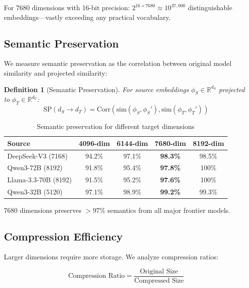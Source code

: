 \documentclass[11pt,letterpaper]{article}
\newtheorem{definition}{Definition}[section]
\begin{document}
For 7680 dimensions with 16-bit precision: $2^{16 \times 7680} \approx 10^{37,000}$ distinguishable embeddings---vastly exceeding any practical vocabulary.

\subsection{Semantic Preservation}

We measure semantic preservation as the correlation between original model similarity and projected similarity:

\begin{definition}[Semantic Preservation]
For source embeddings $\phi_S \in \mathbb{R}^{d_S}$ projected to $\phi_T \in \mathbb{R}^{d_T}$:
\begin{equation}
\text{SP}(d_S \to d_T) = \text{Corr}\left(\text{sim}(\phi_S, \phi_S'), \text{sim}(\phi_T, \phi_T')\right)
\end{equation}
\end{definition}

\begin{table}[h]
\centering
\caption{Semantic preservation for different target dimensions}
\label{tab:preservation}
\begin{tabular}{lcccc}
\toprule
\textbf{Source} & \textbf{4096-dim} & \textbf{6144-dim} & \textbf{7680-dim} & \textbf{8192-dim} \\
\midrule
DeepSeek-V3 (7168) & 94.2\% & 97.1\% & \textbf{98.3\%} & 98.5\% \\
Qwen3-72B (8192) & 91.8\% & 95.4\% & \textbf{97.8\%} & 100\% \\
Llama-3.3-70B (8192) & 91.5\% & 95.2\% & \textbf{97.6\%} & 100\% \\
Qwen3-32B (5120) & 97.1\% & 98.9\% & \textbf{99.2\%} & 99.3\% \\
\bottomrule
\end{tabular}
\end{table}

7680 dimensions preserves $>$97\% semantics from all major frontier models.

\subsection{Compression Efficiency}

Larger dimensions require more storage. We analyze compression ratios:

\begin{equation}
\text{Compression Ratio} = \frac{\text{Original Size}}{\text{Compressed Size}}
\end{equation}
\end{document}
